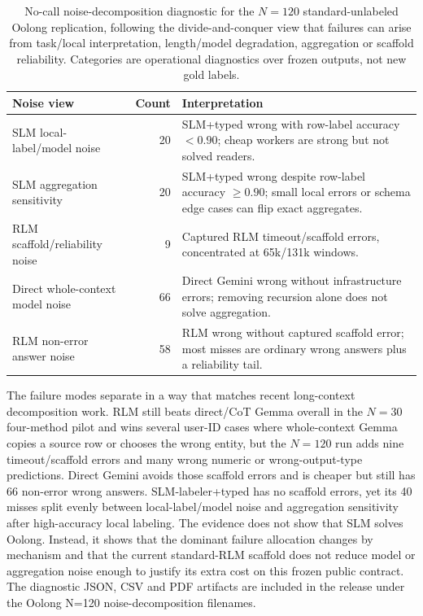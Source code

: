 \documentclass[letterpaper]{article}
\begin{document}
\begin{table}[t]
\centering
\small
\setlength{\tabcolsep}{3pt}
\begin{tabular}{@{}p{2.5cm}rp{4.1cm}@{}}
\toprule
\textbf{Noise view} & \textbf{Count} & \textbf{Interpretation} \\
\midrule
SLM local-label/model noise & 20 & SLM+typed wrong with row-label accuracy $<0.90$; cheap workers are strong but not solved readers. \\
SLM aggregation sensitivity & 20 & SLM+typed wrong despite row-label accuracy $\ge0.90$; small local errors or schema edge cases can flip exact aggregates. \\
RLM scaffold/reliability noise & 9 & Captured RLM timeout/scaffold errors, concentrated at 65k/131k windows. \\
Direct whole-context model noise & 66 & Direct Gemini wrong without infrastructure errors; removing recursion alone does not solve aggregation. \\
RLM non-error answer noise & 58 & RLM wrong without captured scaffold error; most misses are ordinary wrong answers plus a reliability tail. \\
\bottomrule
\end{tabular}
\caption{No-call noise-decomposition diagnostic for the $N=120$ standard-unlabeled Oolong replication, following the divide-and-conquer view that failures can arise from task/local interpretation, length/model degradation, aggregation or scaffold reliability. Categories are operational diagnostics over frozen outputs, not new gold labels.}
\label{tab:supp-oolong-noise}
\end{table}

The failure modes separate in a way that matches recent long-context decomposition work. RLM still beats direct/CoT Gemma overall in the $N=30$ four-method pilot and wins several user-ID cases where whole-context Gemma copies a source row or chooses the wrong entity, but the $N=120$ run adds nine timeout/scaffold errors and many wrong numeric or wrong-output-type predictions. Direct Gemini avoids those scaffold errors and is cheaper but still has 66 non-error wrong answers. SLM-labeler+typed has no scaffold errors, yet its 40 misses split evenly between local-label/model noise and aggregation sensitivity after high-accuracy local labeling. The evidence does not show that SLM solves Oolong. Instead, it shows that the dominant failure allocation changes by mechanism and that the current standard-RLM scaffold does not reduce model or aggregation noise enough to justify its extra cost on this frozen public contract. The diagnostic JSON, CSV and PDF artifacts are included in the release under the Oolong N=120 noise-decomposition filenames.
\end{document}
